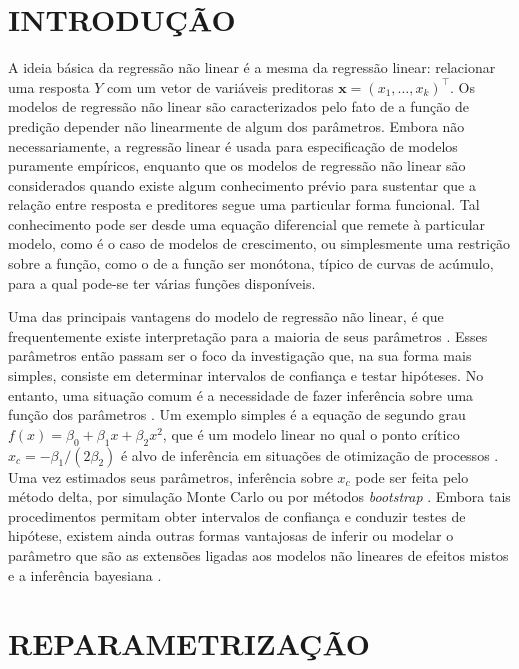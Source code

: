 \section{INTRODUÇÃO}

A ideia básica da regressão não linear é a mesma da regressão linear:
relacionar uma resposta $Y$ com um vetor de variáveis preditoras
$\mathbf{x} = (x_1,\ldots,x_k)^\top$. Os modelos de regressão não
linear são caracterizados pelo fato de a função de predição depender
não linearmente de algum dos parâmetros. Embora não necessariamente, a
regressão linear é usada para especificação de modelos puramente
empíricos, enquanto que os modelos de regressão não linear são
considerados quando existe algum conhecimento prévio para sustentar
que a relação entre resposta e preditores segue uma particular forma
funcional. Tal conhecimento pode ser desde uma equação diferencial que
remete à particular modelo, como é o caso de modelos de crescimento,
ou simplesmente uma restrição sobre a função, como o de a função ser
monótona, típico de curvas de acúmulo, para a qual pode-se ter várias
funções disponíveis.

Uma das principais vantagens do modelo de regressão não linear, é que
frequentemente existe interpretação para a maioria de seus parâmetros
\cite{Schabenberger2002}.  Esses parâmetros então passam ser o foco da
investigação que, na sua forma mais simples, consiste em determinar
intervalos de confiança e testar hipóteses. No entanto, uma situação
comum é a necessidade de fazer inferência sobre uma função dos
parâmetros \cite{Bender1996}.  Um exemplo simples é a equação de
segundo grau $f(x) = \beta_0 + \beta_1 x + \beta_2 x^2$, que é um
modelo linear no qual o ponto crítico $x_c = -\beta_1/(2\beta_2)$ é
alvo de inferência em situações de otimização de processos
\cite{Bas2007}. Uma vez estimados seus parâmetros, inferência sobre
$x_c$ pode ser feita pelo método delta, por simulação Monte Carlo ou
por métodos \emph{bootstrap} \cite{Seber2003}. Embora tais
procedimentos permitam obter intervalos de confiança e conduzir testes
de hipótese, existem ainda outras formas vantajosas de inferir ou
modelar o parâmetro que são as extensões ligadas aos modelos não
lineares de efeitos mistos \cite{Pinheiro2009} e a inferência
bayesiana \cite{Denison2002}.

\newpage
\section{REPARAMETRIZAÇÃO}


